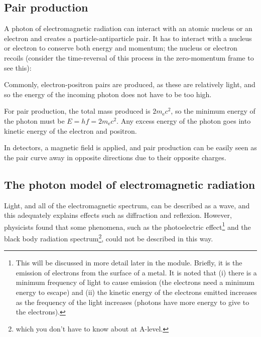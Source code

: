 \documentclass[a4paper,12pt]{article}
\begin{document}
\subsection{Pair production}

A photon of electromagnetic radiation can interact with an atomic nucleus or an electron and creates a particle-antiparticle pair.  It has to interact with a nucleus or electron to conserve both energy and momentum; the nucleus or electron recoils (consider the time-reversal of this process in the zero-momentum frame to see this):\\


Commonly, electron-positron pairs are produced, as these are relatively light, and so the energy of the incoming photon does not have to be too high.

For pair production, the total mass produced is $2m_{\mathrm{e}}c^{2}$, so the minimum energy of the photon must be $E=hf=2m_{\mathrm{e}}c^{2}$.  Any excess energy of the photon goes into kinetic energy of the electron and positron.

In detectors, a magnetic field is applied, and pair production can be easily seen as the pair curve away in opposite directions due to their opposite charges.

\subsection{The photon model of electromagnetic radiation}

Light, and all of the electromagnetic spectrum, can be described as a wave, and this adequately explains effects such as diffraction and reflexion.  However, physicists found that some phenomena, such as the photoelectric effect\footnote{This will be discussed in more detail later in the module.  Briefly, it is the emission of electrons from the surface of a metal.  It is noted that (i) there is a minimum frequency of light to cause emission (the electrons need a minimum energy to escape) and (ii) the kinetic energy of the electrons emitted increases as the frequency of the light increases (photons have more energy to give to the electrons).} and the black body radiation spectrum\footnote{which you don't have to know about at A-level.}, could not be described in this way.
\end{document}
